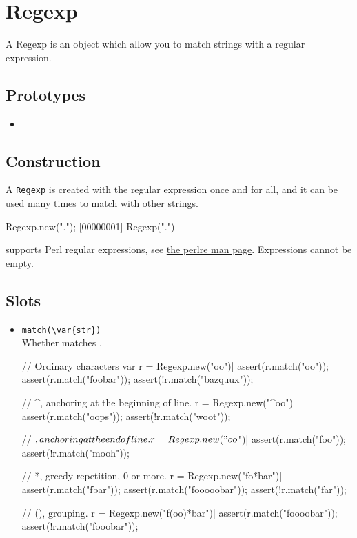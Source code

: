 
\section{Regexp}

A Regexp is an object which allow you to match strings with a regular
expression.

\subsection{Prototypes}
\begin{itemize}
\item {}
\end{itemize}

\subsection{Construction}
\label{stdlib:regexp:ctor}

A \lstinline{Regexp} is created with the regular expression once and
for all, and it can be used many times to match with other strings.

\begin{urbiscript}[firstnumber=1]
Regexp.new(".");
[00000001] Regexp(".")
\end{urbiscript}

\us supports Perl regular expressions, see
\href{http://perldoc.perl.org/perlre.html}{the perlre man page}.
Expressions cannot be empty.

\subsection{Slots}
\begin{itemize}
\item \lstinline|match(\var{str})|\\
  Whether \this matches .
\begin{urbiscript}
// Ordinary characters
var r = Regexp.new("oo")|
assert(r.match("oo"));
assert(r.match("foobar"));
assert(!r.match("bazquux"));

// ^, anchoring at the beginning of line.
r = Regexp.new("^oo")|
assert(r.match("oops"));
assert(!r.match("woot"));

// $, anchoring at the end of line.
r = Regexp.new("oo$")|
assert(r.match("foo"));
assert(!r.match("mooh"));

// *, greedy repetition, 0 or more.
r = Regexp.new("fo*bar")|
assert(r.match("fbar"));
assert(r.match("fooooobar"));
assert(!r.match("far"));

// (), grouping.
r = Regexp.new("f(oo)*bar")|
assert(r.match("foooobar"));
assert(!r.match("fooobar"));
\end{urbiscript}

\end{itemize}

